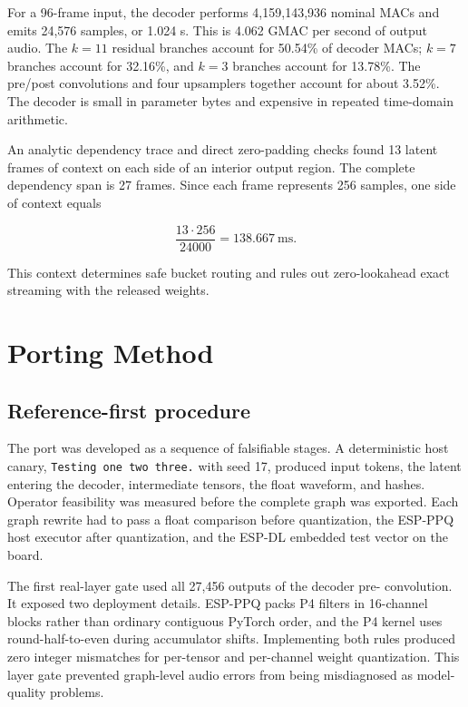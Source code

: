 \documentclass[10pt]{article}
\begin{document}
For a 96-frame input, the decoder performs 4,159,143,936 nominal MACs and
emits 24,576 samples, or 1.024 s. This is 4.062 GMAC per second of output
audio. The $k=11$ residual branches account for 50.54\% of decoder MACs;
$k=7$ branches account for 32.16\%, and $k=3$ branches account for 13.78\%.
The pre/post convolutions and four upsamplers together account for about
3.52\%. The decoder is small in parameter bytes and expensive in repeated
time-domain arithmetic.

An analytic dependency trace and direct zero-padding checks found 13 latent
frames of context on each side of an interior output region. The complete
dependency span is 27 frames. Since each frame represents 256 samples, one
side of context equals

\begin{equation}
  \frac{13\cdot256}{24000}=138.667\ \mathrm{ms}.
\end{equation}

This context determines safe bucket routing and rules out zero-lookahead exact
streaming with the released weights.

\section{Porting Method}

\subsection{Reference-first procedure}

The port was developed as a sequence of falsifiable stages. A deterministic
host canary, \texttt{Testing one two three.} with seed 17, produced input
tokens, the latent entering the decoder, intermediate tensors, the float
waveform, and hashes. Operator feasibility was measured before the complete
graph was exported. Each graph rewrite had to pass a float comparison before
quantization, the ESP-PPQ host executor after quantization, and the ESP-DL
embedded test vector on the board.

The first real-layer gate used all 27,456 outputs of the decoder pre-
convolution. It exposed two deployment details. ESP-PPQ packs P4 filters in
16-channel blocks rather than ordinary contiguous PyTorch order, and the P4
kernel uses round-half-to-even during accumulator shifts. Implementing both
rules produced zero integer mismatches for per-tensor and per-channel weight
quantization. This layer gate prevented graph-level audio errors from being
misdiagnosed as model-quality problems.
\end{document}
